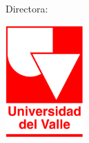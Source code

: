 \begin{titlepage}

\begin{center}
\large

\hfill
\vfill

\begingroup
\color{Maroon}\spacedallcaps{\myTitle} \\ \bigskip %
\endgroup

\spacedlowsmallcaps{\myNameA} \\%


\vfill
Directora:
\spacedlowsmallcaps{\mySupervisor}
\vfill

\includegraphics[width=3cm]{images/logo.eps} \\ \medskip %

\myDepartment \\
\myFaculty \\
\myUni \\ \bigskip

\myTime\ %

\vfill

\end{center}

\end{titlepage}